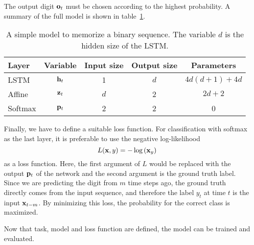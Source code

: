 	The output digit $\mathbf{o}_t$ must be chosen according to the highest probability.
	A summary of the full model is shown in table~\ref{tbl:model_classification_binary_digits}.
	\begin{table}
		\small
		\begin{center}
			\begin{tabular}{|l|c|c|c|c|}
				\hline
				Layer 	& Variable 			& Input size 	& Output size 	& Parameters 			\\ \hline
				LSTM 	& $\mathbf{h}_t$		& 1 			& $d$ 			& $4d(d + 1) + 4d$ 		\\ \hline
				Affine 	& $\mathbf{z}_t$		& $d$ 			& 2 			& $2d + 2$ 				\\ \hline
				Softmax & $\mathbf{p}_t$		& 2 			& 2 			& 0						\\ \hline
			\end{tabular}
		\end{center}
		\caption[A simple model to memorize a binary sequence]
		{A simple model to memorize a binary sequence. The variable $d$ is the hidden size of the LSTM.}
		\label{tbl:model_classification_binary_digits}
	\end{table}
	Finally, we have to define a suitable loss function. 
	For classification with softmax as the last layer, it is preferable to use the negative log-likelihood
	\begin{equation}
		L(\mathbf{x}, y) = -\log\left(\mathbf{x}_y\right)
	\end{equation}
	as a loss function. 
	Here, the first argument of $L$ would be replaced with the output $\mathbf{p}_t$ of the network and the second argument is the ground truth label. 
	Since we are predicting the digit from $m$ time steps ago, the ground truth directly comes from the input sequence, and therefore the label $y_t$ at time $t$ is the input $\mathbf{x}_{t - m}$.
	By minimizing this loss, the probability for the correct class is maximized.
	
	Now that task, model and loss function are defined, the model can be trained and evaluated.
	
	
	
	
	
	